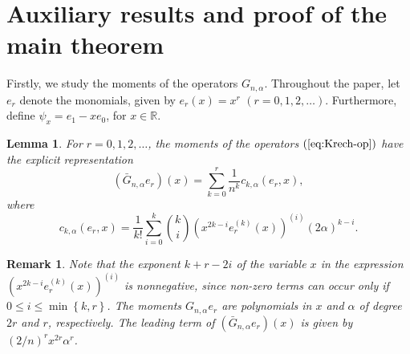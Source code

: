 \documentclass[11pt,a4paper]{article}
\newtheorem{lemma}[theorem]{Lemma}
\newtheorem{remark}[theorem]{Remark}
\begin{document}
\section{Auxiliary results and proof of the main theorem}

Firstly, we study the moments of the operators $G_{n,\alpha }$. Throughout
the paper, let $e_{r}$ denote the monomials, given by $e_{r}\left( x\right)
=x^{r}$ $\left( r=0,1,2,\ldots \right) $. Furthermore, define $\psi
_{x}=e_{1}-xe_{0}$, for $x\in \mathbb{R}$.

\begin{lemma}
\label{lemma-moments}For $r=0,1,2,\ldots $, the moments of the operators $%
\left( \ref{eq:Krech-op}\right) $ have the explicit representation 
\begin{equation*}
\left( \bar{G}_{n,\alpha }e_{r}\right) \left( x\right) =\sum_{k=0}^{r}\frac{1%
}{n^{k}}c_{k,\alpha }\left( e_{r},x\right) ,
\end{equation*}%
where 
\begin{equation*}
c_{k,\alpha }\left( e_{r},x\right) =\frac{1}{k!}\sum_{i=0}^{k}\binom{k}{i}%
\left( x^{2k-i}e_{r}^{\left( k\right) }\left( x\right) \right) ^{\left(
i\right) }\left( 2\alpha \right) ^{k-i}.
\end{equation*}
\end{lemma}

\begin{remark}
Note that the exponent $k+r-2i$ of the variable $x$ in the expression $%
\left( x^{2k-i}e_{r}^{\left( k\right) }\left( x\right) \right) ^{\left(
i\right) }$ is nonnegative, since non-zero terms can occur only if $0\leq
i\leq \min \left\{ k,r\right\} $. The moments $G_{n,\alpha }e_{r}$ are
polynomials in $x$ and $\alpha $ of degree $2r$ and $r$, respectively. The
leading term of $\left( \bar{G}_{n,\alpha }e_{r}\right) \left( x\right) $ is
given by $\left( 2/n\right) ^{r}x^{2r}\alpha ^{r}$.
\end{remark}
\end{document}
